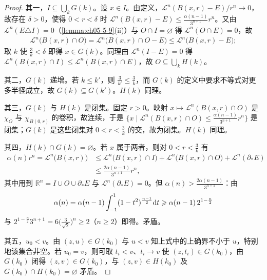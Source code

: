 \documentclass[../../main.tex]{subfiles}%
\begin{document}
\begin{proof}
其一，$I\subseteq\bigcup_kG(k)$。设 $x\in I$。由定义，$\mathcal{L}^n(B(x,r)-E)/r^n\to0$，故存在 $\delta>0$，使得 $0<r<\delta$ 时 $\mathcal{L}^n(B(x,r)-E)\leqslant\frac{\alpha(n-1)}{3^{n+1}}r^n$。又由 $\mathcal{L}^n(E\triangle I)=0$（\cref{lemma:ch05-5-9}(ii)）与 $O\cap I=\varnothing$ 得 $\mathcal{L}^n(O\cap E)=0$，故 %
\begin{align*}
\mathcal{L}^n\bigl(B(x,r)\cap O\bigr)=\mathcal{L}^n\bigl(B(x,r)\cap O-E\bigr)\leqslant\mathcal{L}^n\bigl(B(x,r)-E\bigr);
\end{align*}
取 $k$ 使 $\frac3k<\delta$ 即得 $x\in G(k)$。同理由 $\mathcal{L}^n(I-E)=0$ 得 $\mathcal{L}^n(B(x,r)\cap I)\leqslant\mathcal{L}^n(B(x,r)\cap E)$，故 $O\subseteq\bigcup_kH(k)$。

其二，$G(k)$ 递增。若 $k\leqslant k'$，则 $\frac3{k'}\leqslant\frac3k$，而 $G(k)$ 的定义中要求不等式对更多半径成立，故 $G(k)\subseteq G(k')$。$H(k)$ 同理。

其三，$G(k)$ 与 $H(k)$ 是闭集。固定 $r>0$。映射 $x\mapsto\mathcal{L}^n(B(x,r)\cap O)$ 是 $\chi_O$ 与 $\chi_{B(0,r)}$ 的卷积，故连续，于是 $\{x\mid\mathcal{L}^n(B(x,r)\cap O)\leqslant\frac{\alpha(n-1)}{3^{n+1}}r^n\}$ 是闭集；$G(k)$ 是这些闭集对 $0<r<\frac3k$ 的交，故为闭集。$H(k)$ 同理。

其四，$H(k)\cap G(k)=\varnothing$。若 $x$ 属于两者，则对 $0<r<\frac3k$ 有
\begin{align*}
\alpha(n)r^n=\mathcal{L}^n\bigl(B(x,r)\bigr)&\leqslant\mathcal{L}^n\bigl(B(x,r)\cap I\bigr)+\mathcal{L}^n\bigl(B(x,r)\cap O\bigr)+\mathcal{L}^n(\partial_*E)\\
&\leqslant\frac{2\alpha(n-1)}{3^{n+1}}r^n,
\end{align*}
其中用到 $\mathbb{R}^n=I\cup O\cup\partial_*E$ 与 $\mathcal{L}^n(\partial_*E)=0$。但 $\alpha(n)>\frac{2\alpha(n-1)}{3^{n+1}}$：由
\begin{align*}
\alpha(n)=\alpha(n-1)\int_{-1}^{1}(1-t^2)^{\frac{n-1}{2}}\mathrm{d} t\geqslant\alpha(n-1)\,2^{1-\frac n2}
\end{align*}
与 $2^{1-\frac n2}3^{n+1}=6\bigl(\frac{3}{\sqrt2}\bigr)^n\geqslant2$（$n\geqslant2$）即得。矛盾。

其五，$u_0<v$。由 $(z,u)\in G(k_0)$ 与 $u<v$ 知上式中的上确界不小于 $u$，特别地该集合非空。若 $u_0=v$，则可取 $t_i<v$、$t_i\to v$ 使 $(z,t_i)\in G(k_0)$，由 $G(k_0)$ 闭得 $(z,v)\in G(k_0)$，与 $(z,v)\in H(k_0)$ 及 $G(k_0)\cap H(k_0)=\varnothing$ 矛盾。


\end{proof}
\end{document}
